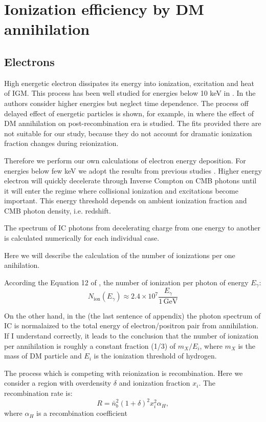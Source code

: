 \section{Ionization efficiency by DM annihilation}
\label{sec:DMspectrum}

\subsection{Electrons}

High energetic electron dissipates its energy into ionization, excitation and heat of IGM. This process has been well studied for energies below 10 keV in \cite{Shull_1979,Shull_1985,Dalgarno_1999,Furlanetto_2010}. In \cite{Vald_s_2010} the authors consider higher energies but neglect time dependence. The process off delayed effect of energetic particles is shown, for example, in \cite{2015arXiv150603812S} where the effect of DM annihilation on post-recombination era is studied. The fits provided there are not suitable for our study, because they do not account for dramatic ionization fraction changes during reionization.

Therefore we perform our own calculations of electron energy deposition. For energies below few keV we adopt the results from previous studies \cite{Shull_1985,Furlanetto_2010}. Higher energy electron will quickly decelerate through Inverse Compton on CMB photons until it will enter the regime where collisional ionization and excitations become important. This energy threshold depends on ambient ionization fraction and CMB photon density, i.e. redshift.

The spectrum of IC photons from decelerating charge from one energy to another is calculated numerically for each individual case.

Here we will describe the calculation of the number of ionizations per one anihilation.

According the Equation 12 of \cite{Belikov_2009}, the number of ionization per photon of energy $E_\gamma$:
\begin{equation}
N_\mathrm{ion}(E_\gamma) \approx 2.4\times10^7\dfrac{E_\gamma}{1\,\mathrm{GeV}}
\end{equation}

On the other hand, in the \cite{Belikov_2010} (the last sentence of appendix) the photon spectrum of IC is normalaized to the total energy of electron/positron pair from annihilation. If I understand correctly, it leads to the conclusion that the number of ionization per annihilation is roughly a constant fraction (1/3) of $m_X/E_i$, where $m_X$ is the mass of DM particle and $E_i$ is the ionization threshold of hydrogen.


The process which is competing with reionization is recombination. Here we consider a region with overdensity $\delta$ and ionization fraction $x_i$. The recombination rate is:
\begin{equation}
R = \bar{n}_b^2 (1+\delta)^2 x_i^2 \alpha_H,
\end{equation}
where $\alpha_H$ is a recombination coefficient
  
  